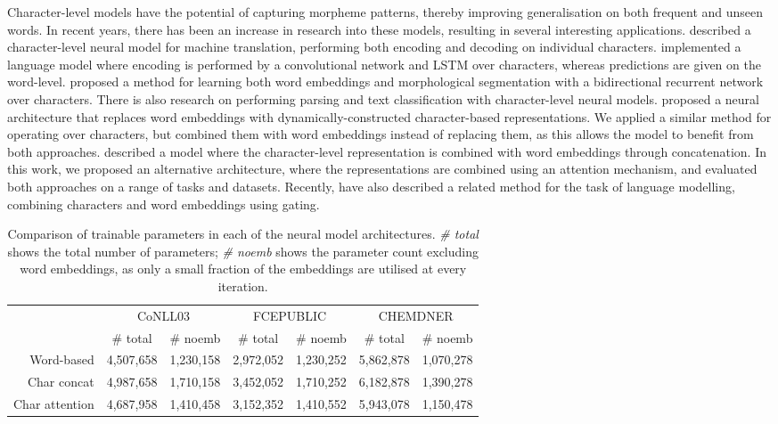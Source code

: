 \documentclass[11pt]{article}
\begin{document}
Character-level models have the potential of capturing morpheme patterns, thereby improving generalisation on both frequent and unseen words. In recent years, there has been an increase in research into these models, resulting in several interesting applications.
 described a character-level neural model for machine translation, performing both encoding and decoding on individual characters.
 implemented a language model where encoding is performed by a convolutional network and LSTM over characters, whereas predictions are given on the word-level.
 proposed a method for learning both word embeddings and morphological segmentation with a bidirectional recurrent network over characters.
There is also research on performing parsing \cite{Ballesteros2015} and text classification \cite{Zhang2015a} with character-level neural models.
 proposed a neural architecture that replaces word embeddings with dynamically-constructed character-based representations. We applied a similar method for operating over characters, but combined them with word embeddings instead of replacing them, as this allows the model to benefit from both approaches.
 described a model where the character-level representation is combined with word embeddings through concatenation. 
In this work, we proposed an alternative architecture, where the representations are combined using an attention mechanism, and evaluated both approaches on a range of tasks and datasets.
Recently,  have also described a related method for the task of language modelling, combining characters and word embeddings using gating.


\begin{table*}
\setlength\tabcolsep{9pt}
\begin{tabular}{r|cc|cc|cc} \toprule
 & \multicolumn{2}{c|}{CoNLL03} & \multicolumn{2}{c|}{FCEPUBLIC} & \multicolumn{2}{c}{CHEMDNER} \\ 
 & \# total & \# noemb & \# total & \# noemb & \# total & \# noemb  \\ \midrule 
Word-based & 4,507,658 & 1,230,158 & 2,972,052 & 1,230,252 & 5,862,878 & 1,070,278 \\
Char concat & 4,987,658 & 1,710,158 & 3,452,052 & 1,710,252 & 6,182,878 & 1,390,278 \\
Char attention & 4,687,958 & 1,410,458 & 3,152,352 & 1,410,552 & 5,943,078 & 1,150,478 \\ \bottomrule
\end{tabular}
\caption{Comparison of trainable parameters in each of the neural model architectures. \textit{\# total} shows the total number of parameters; \textit{\# noemb} shows the parameter count excluding word embeddings, as only a small fraction of the embeddings are utilised at every iteration.}
\label{tab:paramsizes}
\end{table*}
\end{document}
